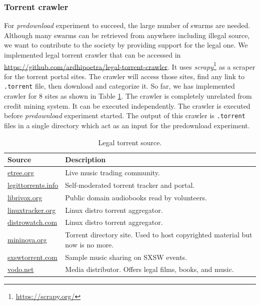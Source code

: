 \subsubsection{Torrent crawler}
For \textit{predownload} experiment to succeed, the large number of swarms are needed. Although many swarms can be retrieved from anywhere including illegal source, we want to contribute to the society by providing support for the legal one. We implemented legal torrent crawler that can be accessed in \url{https://github.com/ardhipoetra/legal-torrent-crawler}. It uses \textit{scrapy}\footnote{\url{https://scrapy.org/}} as a scraper for the torrent portal sites. The crawler will access those sites, find any link to \texttt{.torrent} file, then download and categorize it. So far, we has implemented crawler for 8 sites as shown in Table \ref{tbl:legaltorrentsource}. The crawler is completely unrelated from credit mining system. It can be executed independently. The crawler is executed before \textit{predownload} experiment started. The output of this crawler is \texttt{.torrent} files in a single directory which act as an input for the predownload experiment.

\begin{table}[h]
	\centering
	\caption{Legal torrent source.}
	\label{tbl:legaltorrentsource}
	\begin{tabular}{lp{8.5cm}}
		\hline
		Source & Description \\ \hline
		\url{etree.org} & Live music trading community. \\
		\url{legittorrents.info} & Self-moderated torrent tracker and portal. \\
		\url{librivox.org} & Public domain audiobooks read by volunteers. \\
		\url{linuxtracker.org} & Linux distro torrent aggregator. \\
		\url{distrowatch.com} & Linux distro torrent aggregator. \\
		\url{mininova.org} & Torrent directory site. Used to host copyrighted material but now is no more.\\
		\url{sxswtorrent.com} & Sample music sharing on SXSW events. \\
		\url{vodo.net} & Media distributor. Offers legal films, books, and music.
	\end{tabular}
\end{table}

%
